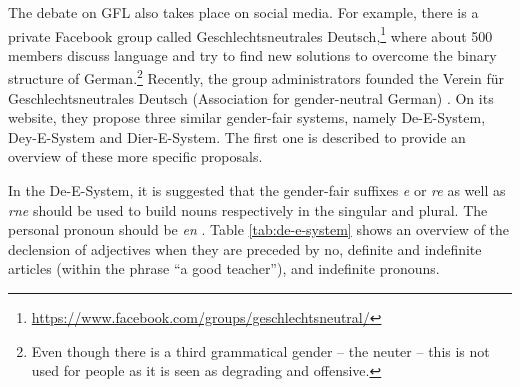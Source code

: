 
\begin{table}
        \caption[Overview of the neopronoun \textit{xier}]{Overview of the pronoun \textit{xier} \citep{heger2020xier}}
    \label{tab:xier}
\end{table}

The debate on GFL also takes place on social media. For example, there is a private Facebook group called Geschlechtsneutrales Deutsch,\footnote{\url{https://www.facebook.com/groups/geschlechtsneutral/}} where about 500 members discuss language and try to find new solutions to overcome the binary structure of German.\footnote{Even though there is a third grammatical gender -- the neuter -- this is not used for people as it is seen as degrading and offensive.} Recently, the group administrators founded the Verein für Geschlechtsneutrales Deutsch (Association for gender-neutral German) \citep{vereindeutsch}. On its website, they propose three similar gender-fair systems, namely De-E-System, Dey-E-System and Dier-E-System. The first one is described to provide an overview of these more specific proposals. 

In the De-E-System, it is suggested that the gender-fair suffixes \textit{e} or \textit{re} as well as \textit{rne} should be used to build nouns respectively in the singular and plural. The personal pronoun should be \textit{en} \citep{vereindeutschdee}. Table \ref{tab:de-e-system} shows an overview of the declension of adjectives when they are preceded by no, definite and indefinite articles (within the phrase ``a good teacher''), and indefinite pronouns.

